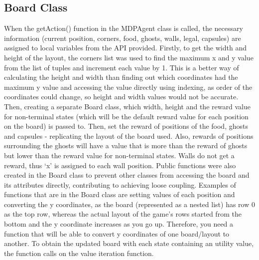 \documentclass[12pt]{report}
\begin{document}
      \subsection*{Board Class}
        When the getAction() function in the MDPAgent class is called, the necessary information (current position, corners, food, ghosts, walls, legal, capsules) are assigned to local variables from the API provided.
        \newline \newline
        Firstly, to get the width and height of the layout, the corners list was used to find the maximum x and y value from the list of tuples and increment each value by 1. This is a better way of calculating the height and width than finding out which coordinates had the maximum y value and accessing the value directly using indexing, as order of the coordinates could change, so height and width values would not be accurate.
        \newline \newline
        Then, creating a separate Board class, which width, height and the reward value for non-terminal states (which will be the default reward value for each position on the board) is passed to. Then, set the reward of positions of the food, ghosts and capsules - replicating the layout of the board used. Also, rewards of positions surrounding the ghosts will have a value that is more than the reward of ghosts but lower than the reward value for non-terminal states. Walls do not get a reward, thus `x' is assigned to each wall position.
        \newline \newline
        Public functions were also created in the Board class to prevent other classes from accessing the board and its attributes directly, contributing to achieving loose coupling. Examples of functions that are in the Board class are setting values of each position and converting the y coordinates, as the board (represented as a nested list) has row 0 as the top row, whereas the actual layout of the game's rows started from the bottom and the y coordinate increases as you go up. Therefore, you need a function that will be able to convert y coordinates of one board/layout to another.
        \newline \newline
        To obtain the updated board with each state containing an utility value, the function calls on the value iteration function.
\end{document}
